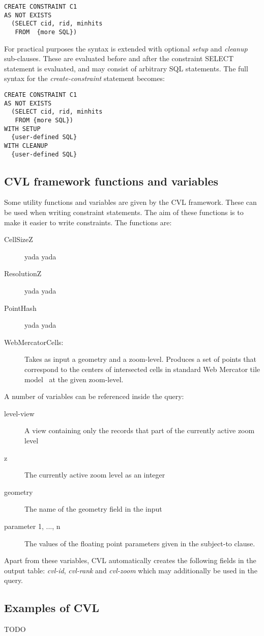 \begin{lstlisting}
CREATE CONSTRAINT C1
AS NOT EXISTS
  (SELECT cid, rid, minhits
   FROM  {more SQL})
\end{lstlisting}

For practical purposes the syntax is extended with optional \emph{setup} and \emph{cleanup} sub-clauses. These are evaluated before and after the constraint SELECT statement is evaluated, and may consist of arbitrary SQL statements. The full syntax for the \emph{create-constraint} statement becomes:

\begin{lstlisting}
CREATE CONSTRAINT C1 
AS NOT EXISTS
  (SELECT cid, rid, minhits
   FROM {more SQL})
WITH SETUP
  {user-defined SQL}
WITH CLEANUP
  {user-defined SQL}
\end{lstlisting}

\subsection{CVL framework functions and variables}

Some utility functions and variables are given by the CVL framework. These can be used when writing constraint statements. The aim of these functions is to make it easier to write constraints. The functions are:

\begin{description}
\item [CellSizeZ] yada yada
\item [ResolutionZ] yada yada
\item [PointHash] yada yada
\item [WebMercatorCells:] Takes as input a geometry and a zoom-level. Produces a set of points that correspond to the centers of intersected cells in standard Web Mercator tile model~\cite{osm?} at the given zoom-level.
\end{description}

A number of variables can be referenced inside the query:

\begin{description}
\item[level-view] A view containing only the records that part of the currently active zoom level
\item[z] The currently active zoom level as an integer
\item[geometry] The name of the geometry field in the input
\item[parameter 1, ..., n] The values of the floating point parameters given in the subject-to clause.
\end{description}

Apart from these variables, CVL automatically creates the following fields in the output table: \emph{cvl-id}, \emph{cvl-rank} and \emph{cvl-zoom} which may additionally be used in the query.

\subsection{Examples of CVL}

TODO
